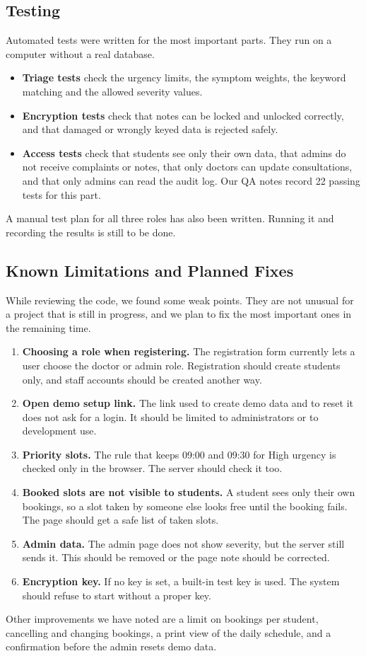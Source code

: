 \documentclass[12pt,a4paper]{article}
\begin{document}
\subsection{Testing}
Automated tests were written for the most important parts. They run on a computer without a real database.
\begin{itemize}
  \item \textbf{Triage tests} check the urgency limits, the symptom weights, the keyword matching and the allowed severity values.
  \item \textbf{Encryption tests} check that notes can be locked and unlocked correctly, and that damaged or wrongly keyed data is rejected safely.
  \item \textbf{Access tests} check that students see only their own data, that admins do not receive complaints or notes, that only doctors can update consultations, and that only admins can read the audit log. Our QA notes record 22 passing tests for this part.
\end{itemize}
A manual test plan for all three roles has also been written. Running it and recording the results is still to be done.

\subsection{Known Limitations and Planned Fixes}
While reviewing the code, we found some weak points. They are not unusual for a project that is still in progress, and we plan to fix the most important ones in the remaining time.
\begin{enumerate}
  \item \textbf{Choosing a role when registering.} The registration form currently lets a user choose the doctor or admin role. Registration should create students only, and staff accounts should be created another way.
  \item \textbf{Open demo setup link.} The link used to create demo data and to reset it does not ask for a login. It should be limited to administrators or to development use.
  \item \textbf{Priority slots.} The rule that keeps 09:00 and 09:30 for High urgency is checked only in the browser. The server should check it too.
  \item \textbf{Booked slots are not visible to students.} A student sees only their own bookings, so a slot taken by someone else looks free until the booking fails. The page should get a safe list of taken slots.
  \item \textbf{Admin data.} The admin page does not show severity, but the server still sends it. This should be removed or the page note should be corrected.
  \item \textbf{Encryption key.} If no key is set, a built-in test key is used. The system should refuse to start without a proper key.
\end{enumerate}
Other improvements we have noted are a limit on bookings per student, cancelling and changing bookings, a print view of the daily schedule, and a confirmation before the admin resets demo data.
\end{document}
